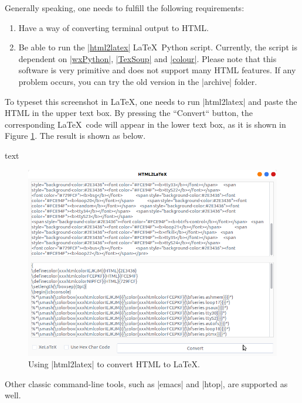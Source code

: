 \documentclass[letterpaper, 11pt, DIV=11]{scrartcl}
\begin{document}
Generally speaking, one needs to fulfill the following requirements:
\begin{enumerate}
\item Have a way of converting terminal output to HTML.
\item Be able to run the \href{https://github.com/xziyue/latex-beautiful-listings-screenshot/blob/master/html2tex_gui.py}{\rawinline|html2latex|} \LaTeX\ Python script. Currently, the script is dependent on \href{https://pypi.org/project/wxPython/}{\rawinline|wxPython|}, \href{https://pypi.org/project/TexSoup/}{\rawinline|TexSoup|} and \href{https://pypi.org/project/colour/}{\rawinline|colour|}. Please note that this software is very primitive and does not support many HTML features. If any problem occurs, you can try the old version in the \rawinline|archive| folder.
\end{enumerate}

To typeset this screenshot in \LaTeX, one needs to run \rawinline|html2latex| and paste the HTML in the upper text box. By pressing the ``Convert`` button, the corresponding \LaTeX\ code will appear in the lower text box, as it is shown in Figure \ref{fig:python-html2latex}. The result is shown as below.

\begin{tcbsrccode}{text}

\end{tcbsrccode}


\begin{figure}[htpb]
\centering
\includegraphics[width=0.7\linewidth]{../res/html2latex}
\caption{Using \rawinline|html2latex| to convert HTML to \LaTeX.}
\label{fig:python-html2latex}
\end{figure} 

Other classic command-line tools, such as \rawinline|emacs| and \rawinline|htop|, are supported as well.
\end{document}

